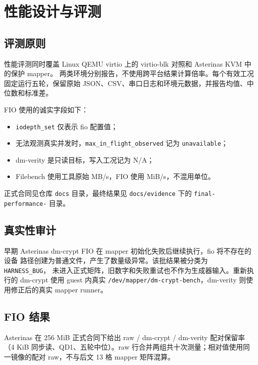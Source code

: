 \chapter{性能设计与评测}

\section{评测原则}

性能评测同时覆盖 Linux QEMU virtio 上的 virtio-blk 对照和 Asterinas KVM 中的保护 mapper。
两类环境分别报告，不使用跨平台结果计算倍率。每个有效工况固定运行五轮，保留原始
JSON、CSV、串口日志和环境元数据，并报告均值、中位数和标准差。

FIO 使用的诚实字段如下：

\begin{itemize}
    \item \texttt{iodepth\_set} 仅表示 fio 配置值；
    \item 无法观测真实并发时，\texttt{max\_\allowbreak in\_\allowbreak flight\_\allowbreak observed} 记为 \texttt{unavailable}；
    \item dm-verity 是只读目标，写入工况记为 N/A；
    \item Filebench 使用工具原始 MB/s，FIO 使用 MiB/s，不混用单位。
\end{itemize}

正式合同见仓库 \texttt{docs} 目录，最终结果见 \texttt{docs/\allowbreak evidence} 下的
\texttt{final-\allowbreak performance-} 目录。

\section{真实性审计}

早期 Asterinas dm-crypt FIO 在 mapper 初始化失败后继续执行，fio 将不存在的设备
路径创建为普通文件，产生了数量级异常。该批结果被分类为 \texttt{HARNESS\_\allowbreak BUG}，
未进入正式矩阵，旧数字和失败重试也不作为生成器输入。重新执行的 dm-crypt 使用
guest 内真实 \texttt{/dev/\allowbreak mapper/\allowbreak dm-\allowbreak crypt-\allowbreak bench}，dm-verity 则使用修正后的真实
mapper runner。

\section{FIO 结果}

Asterinas 在 256 MiB 正式合同下给出 raw / dm-crypt / dm-verity 配对保留率（4 KiB 同步读、QD1、五轮中位）。raw 行合并两组共十次测量；相对值使用同一镜像的配对 raw，不与后文 13 格 mapper 矩阵混算。

